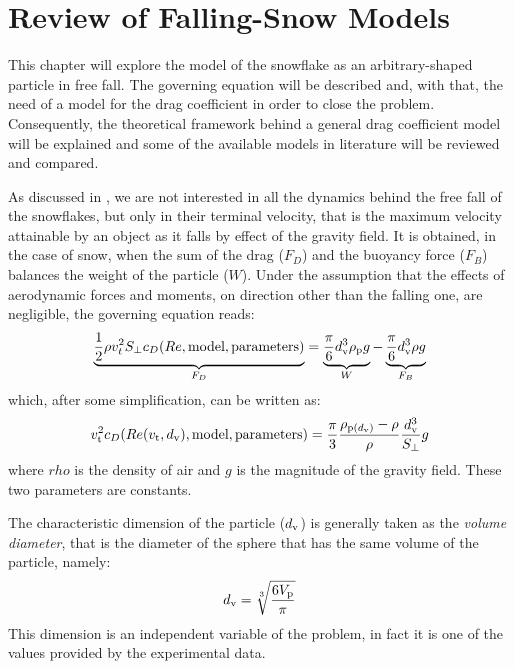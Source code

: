 
\chapter{Review of Falling-Snow Models}
\label{ch: Review}
	This chapter will explore the model of the snowflake as an arbitrary-shaped particle in free fall. The governing equation will be described and, with that, the need of a model for the drag coefficient in order to close the problem. Consequently, the theoretical framework behind a general drag coefficient model will be explained and some of the available models in literature will be reviewed and compared. 
	
	As discussed in , we are not interested in all the dynamics behind the free fall of the snowflakes, but only in their terminal velocity, that is the maximum velocity attainable by an object as it falls by effect of the gravity field. It is obtained, in the case of snow, when the sum of the drag ($ F_{D} $) and the buoyancy force ($ F_B $) balances the weight of the particle ($ W $). Under the assumption that the effects of aerodynamic forces and moments, on direction other than the falling one, are negligible, the governing equation reads:
	\begin{equation}
		\underbrace{\frac{1}{2} \rho v_t^2 S_{\perp} c_D(Re, \text{model}, \text{parameters})}_{F_{D}} = 
		\underbrace{\frac{\pi}{6} d_{\textup{v}}^3 \rho_{\textup{p}} g}_{W} - 
		\underbrace{\frac{\pi}{6} d_{\textup{v}}^3 \rho g}_{F_B}
		\label{eq: governing}
	\end{equation}
	which, after some simplification, can be written as:
	\begin{equation}
		v_{\textup{t}}^2 c_D(Re(v_{\textup{t}}, d_{\textup{v}}), \text{model}, \text{parameters}) = 
		\frac{\pi}{3} \dfrac{\rho_{\textup{p}(d_{\textup{v}})} - \rho}{\rho} \dfrac{d_{\textup{v}}^3}{S_{\perp}} g
		\label{eq: terminalVelocity}
	\end{equation}
	where $ rho $ is the density of air and $ g $ is the magnitude of the gravity field. These two parameters are constants.
	
	The characteristic dimension of the particle ($ d_{\textup{v}} $) is generally taken as the \textit{volume diameter}, that is the diameter of the sphere that has the same volume of the particle, namely:
	\begin{equation}
		d_{\textup{v}} = \sqrt[3]{\dfrac{6 V_{\textup{p}}}{\pi}}
		\label{eq: dv}
	\end{equation}
	This dimension is an independent variable of the problem, in fact it is one of the values provided by the experimental data.

